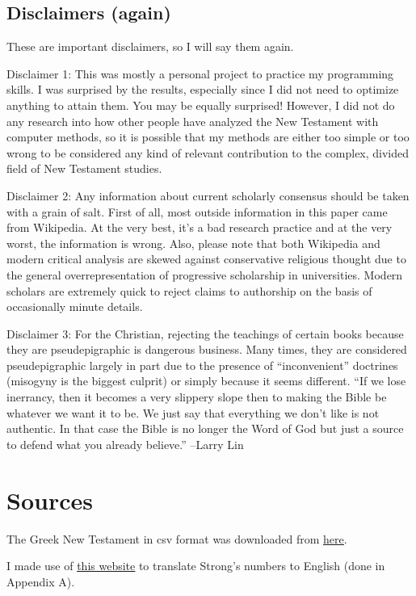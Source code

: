 \documentclass[12pt,letterpaper]{article}
\begin{document}
\subsection{Disclaimers (again)}
These are important disclaimers, so I will say them again.

Disclaimer 1: This was mostly a personal project to practice my programming skills.  I was surprised by the results, especially since I did not need to optimize anything to attain them.  You may be equally surprised!  However, I did not do any research into how other people have analyzed the New Testament with computer methods, so it is possible that my methods are either too simple or too wrong to be considered any kind of relevant contribution to the complex, divided field of New Testament studies.  

Disclaimer 2: Any information about current scholarly consensus should be taken with a grain of salt.  First of all, most outside information in this paper came from Wikipedia.  At the very best, it's a bad research practice and at the very worst, the information is wrong.  Also, please note that both Wikipedia and modern critical analysis are skewed against conservative religious thought due to the general overrepresentation of progressive scholarship in universities.  Modern scholars are extremely quick to reject claims to authorship on the basis of occasionally minute details.  

Disclaimer 3: For the Christian, rejecting the teachings of certain books because they are pseudepigraphic is dangerous business.  Many times, they are considered pseudepigraphic largely in part due to the presence of ``inconvenient'' doctrines (misogyny is the biggest culprit) or simply because it seems different.  ``If we lose inerrancy, then it becomes a very slippery slope then to making the Bible be whatever we want it to be.  We just say that everything we don't like is not authentic.  In that case the Bible is no longer the Word of God but just a source to defend what you already believe.'' --Larry Lin


\section{Sources}
The Greek New Testament in csv format was downloaded from \underline{\href{https://github.com/biblicalhumanities/Nestle1904/tree/master/morph}{here}}.  

I made use of \underline{\href{http://kingjamesbibledictionary.com/}{this website}} to translate Strong's numbers to English (done in Appendix A).
\end{document}
